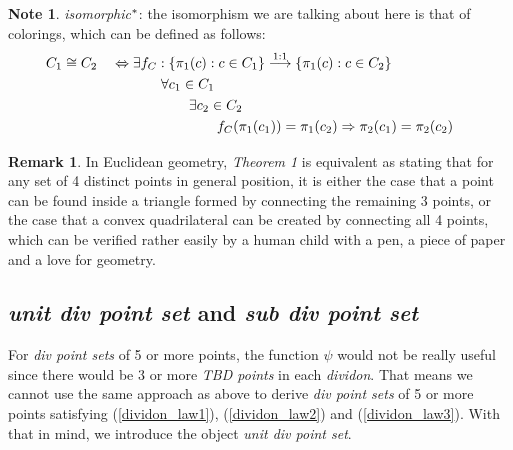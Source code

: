 \documentclass[11pt, oneside]{article}      %
\theoremstyle{definition}
\newtheorem*{note}{Note}
\numberwithin{equation}{section}
\newtheorem*{remark}{Remark}
\newcommand{\reff}[1]{(\ref{#1})}
\theoremstyle{c}
\begin{document}
\begin{note}
\textit{isomorphic$\color{black}^*$}: the isomorphism we are talking about here is that of colorings, which can be defined as follows:
\begin{alignat}{2}
  &C_1 \cong C_2 && \Leftrightarrow \begin{aligned}[t] \renewcommand\arraystretch{1.25}\begin{array}[t]{@{\hskip0em}l}
  \exists f_{C}: \{ \pi_1(c) : c \in C_1\} \stackrel{\rm{1:1}}{\longrightarrow} \{ \pi_1(c) : c \in C_2\}\\
 \qquad\forall c_1 \in C_1 \\
 \qquad\qquad\exists c_2 \in C_2 \\
 \qquad\qquad\qquad f_{C}(\pi_1(c_1)) = \pi_1(c_2) \Rightarrow \pi_2(c_1) = \pi_2(c_2) \\
  \end{array}
  \end{aligned}
\end{alignat}
\end{note}

\begin{remark}
In Euclidean geometry, \textit{Theorem 1} is equivalent as stating that for any set of 4 distinct points in general position, it is either the case that a point can be found inside a triangle formed by connecting the remaining 3 points, or the case that a convex quadrilateral can be created by connecting all 4 points, which can be verified rather easily by a human child with a pen, a piece of paper and a love for geometry.
\end{remark}

\subsection{ \textit{unit div point set} and \textit{sub div point set}}
For \textit{div point sets} of 5 or more points, the function $\psi$  would not be really useful since there would be 3 or more \textit{TBD points} in each \textit{dividon}. That means we cannot use the same approach as above to derive \textit{div point sets} of 5 or more points satisfying \reff{dividon_law1}, \reff{dividon_law2} and \reff{dividon_law3}. With that in mind, we introduce the object \textit{unit div point set}.
\end{document}
